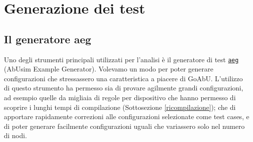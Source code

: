 \documentclass[target=bach]{thud}
\newcommand{\aeg}[0]{{\lstinline{aeg}}\xspace}
\begin{document}
\chapter{Generazione dei test}\label{aeg}

\section{Il generatore aeg}\label{aeg:descrizione}

Uno degli strumenti principali utilizzati per l'analisi è il generatore di test \href{https://github.com/KayJay7/abusim-example-generator}{\aeg} (AbUsim Example Generator). Volevamo un modo per poter generare configurazioni che stressassero una caratteristica a piacere di GoAbU. L'utilizzo di questo strumento ha permesso sia di provare agilmente grandi configurazioni, ad esempio quelle da migliaia di regole per dispositivo che hanno permesso di scoprire i lunghi tempi di compilazione (Sottosezione \ref{ricompilazione}); che di apportare rapidamente correzioni alle configurazioni selezionate come test cases, e di poter generare facilmente configurazioni uguali che variassero solo nel numero di nodi.
\end{document}
